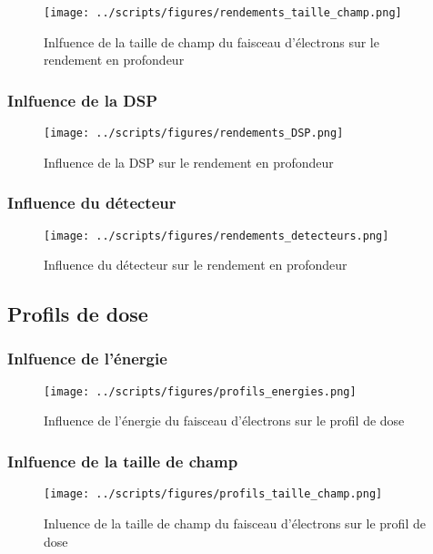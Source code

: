 \documentclass{article}
\begin{document}
\begin{figure}[h]
  \centering
  \texttt{[image: ../scripts/figures/rendements\_taille\_champ.png]}
  \caption{Inlfuence de la taille de champ du faisceau d'électrons sur le rendement en profondeur}
  \label{fig_rdt_champ}
\end{figure}

\subsubsection{Inlfuence de la DSP}

\begin{figure}[h!]
  \centering
  \texttt{[image: ../scripts/figures/rendements\_DSP.png]}
  \caption{Influence de la DSP sur le rendement en profondeur}
  \label{fig_rdt_DSP}
\end{figure}

\subsubsection{Influence du détecteur}

\begin{figure}[h!]
  \centering
  \texttt{[image: ../scripts/figures/rendements\_detecteurs.png]}
  \caption{Influence du détecteur sur le rendement en profondeur}
  \label{fig_rdt_detecteur}
\end{figure}

\subsection{Profils de dose}
\subsubsection{Inlfuence de l'énergie}

\begin{figure}[h]
  \centering
  \texttt{[image: ../scripts/figures/profils\_energies.png]}
  \caption{Influence de l'énergie du faisceau d'électrons sur le profil de dose}
  \label{fig_profil_energie}
\end{figure}

\subsubsection{Inlfuence de la taille de champ}

\begin{figure}[h]
  \centering
  \texttt{[image: ../scripts/figures/profils\_taille\_champ.png]}
  \caption{Inluence de la taille de champ du faisceau d'électrons sur le profil de dose}
  \label{fig_profils_taille}
\end{figure}
\end{document}
